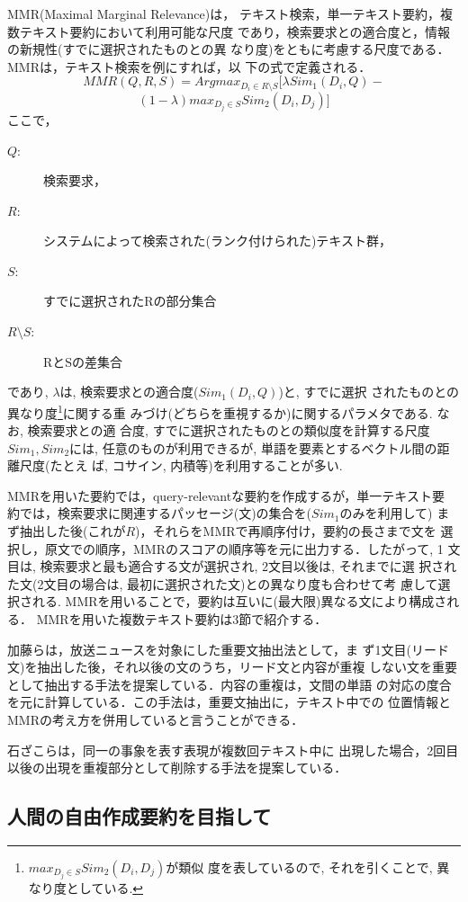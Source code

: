 MMR(Maximal Marginal Relevance)\cite{carbonell:97:a,carbonell:98:a}は，
テキスト検索，単一テキスト要約，複数テキスト要約において利用可能な尺度
であり，検索要求との適合度と，情報の新規性(すでに選択されたものとの異
なり度)をともに考慮する尺度である．MMRは，テキスト検索を例にすれば，以
下の式で定義される．
\[ MMR(Q,R,S) = Argmax_{D_i \in R \setminus S} [ \lambda Sim_1(D_i,Q) - \]
\[ (1-\lambda) max_{D_j \in S} Sim_2(D_i,D_j) ] \]
ここで，
\begin{description}
\item[$Q$:] 検索要求，
\item[$R$:] システムによって検索された(ランク付けられた)テキスト群，
\item[$S$:] すでに選択されたRの部分集合
\item[$R \setminus S$:] RとSの差集合
\end{description}
であり, $\lambda$は, 検索要求との適合度($Sim_1(D_i,Q)$)と, すでに選択
されたものとの異なり度\footnote{$max_{D_j \in S} Sim_2(D_i,D_j)$が類似
度を表しているので, それを引くことで, 異なり度としている. }に関する重
みづけ(どちらを重視するか)に関するパラメタである. なお, 検索要求との適
合度, すでに選択されたものとの類似度を計算する尺度$Sim_1, Sim_2$には, 
任意のものが利用できるが, 単語を要素とするベクトル間の距離尺度(たとえ
ば, コサイン, 内積等)を利用することが多い.

MMRを用いた要約では，query-relevantな要約を作成するが，単一テキスト要
約では，検索要求に関連するパッセージ(文)の集合を($Sim_1$のみを利用して) 
まず抽出した後(これが$R$)，それらをMMRで再順序付け，要約の長さまで文を
選択し，原文での順序，MMRのスコアの順序等を元に出力する．したがって, 1 
文目は, 検索要求と最も適合する文が選択され, 2文目以後は, それまでに選
択された文(2文目の場合は, 最初に選択された文)との異なり度も合わせて考
慮して選択される.
MMRを用いることで，要約は互いに(最大限)異なる文により構成される．
MMRを用いた複数テキスト要約は3節で紹介する．

加藤ら\cite{kato:00:a}は，放送ニュースを対象にした重要文抽出法として，ま
ず1文目(リード文)を抽出した後，それ以後の文のうち，リード文と内容が重複
しない文を重要として抽出する手法を提案している．内容の重複は，文間の単語
の対応の度合を元に計算している．この手法は，重要文抽出に，テキスト中での
位置情報とMMRの考え方を併用していると言うことができる．

石ざこら\cite{ishizako:99:a}は，同一の事象を表す表現が複数回テキスト中に
出現した場合，2回目以後の出現を重複部分として削除する手法を提案している． 

\subsection{人間の自由作成要約を目指して}

